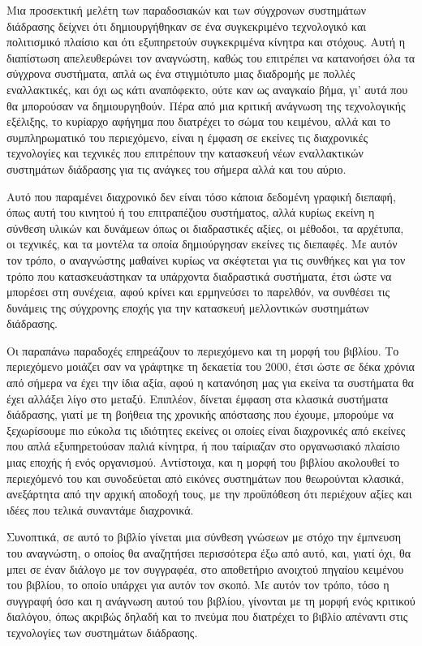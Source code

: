 \documentclass[
]{article}
\begin{document}
Μια προσεκτική μελέτη των παραδοσιακών και των σύγχρονων συστημάτων
διάδρασης δείχνει ότι δημιουργήθηκαν σε ένα συγκεκριμένο τεχνολογικό και
πολιτισμικό πλαίσιο και ότι εξυπηρετούν συγκεκριμένα κίνητρα και
στόχους. Αυτή η διαπίστωση απελευθερώνει τον αναγνώστη, καθώς του
επιτρέπει να κατανοήσει όλα τα σύγχρονα συστήματα, απλά ως ένα
στιγμιότυπο μιας διαδρομής με πολλές εναλλακτικές, και όχι ως κάτι
αναπόφεκτο, ούτε καν ως αναγκαίο βήμα, γι' αυτά που θα μπορούσαν να
δημιουργηθούν. Πέρα από μια κριτική ανάγνωση της τεχνολογικής εξέλιξης,
το κυρίαρχο αφήγημα που διατρέχει το σώμα του κειμένου, αλλά και το
συμπληρωματικό του περιεχόμενο, είναι η έμφαση σε εκείνες τις
διαχρονικές τεχνολογίες και τεχνικές που επιτρέπουν την κατασκευή νέων
εναλλακτικών συστημάτων διάδρασης για τις ανάγκες του σήμερα αλλά και
του αύριο.

Αυτό που παραμένει διαχρονικό δεν είναι τόσο κάποια δεδομένη γραφική
διεπαφή, όπως αυτή του κινητού ή του επιτραπέζιου συστήματος, αλλά
κυρίως εκείνη η σύνθεση υλικών και δυνάμεων όπως οι διαδραστικές αξίες,
οι μέθοδοι, τα αρχέτυπα, οι τεχνικές, και τα μοντέλα τα οποία
δημιούργησαν εκείνες τις διεπαφές. Με αυτόν τον τρόπο, ο αναγνώστης
μαθαίνει κυρίως να σκέφτεται για τις συνθήκες και για τον τρόπο που
κατασκευάστηκαν τα υπάρχοντα διαδραστικά συστήματα, έτσι ώστε να
μπορέσει στη συνέχεια, αφού κρίνει και ερμηνεύσει το παρελθόν, να
συνθέσει τις δυνάμεις της σύγχρονης εποχής για την κατασκευή μελλοντικών
συστημάτων διάδρασης.

Οι παραπάνω παραδοχές επηρεάζουν το περιεχόμενο και τη μορφή του
βιβλίου. Το περιεχόμενο μοιάζει σαν να γράφτηκε τη δεκαετία του 2000,
έτσι ώστε σε δέκα χρόνια από σήμερα να έχει την ίδια αξία, αφού η
κατανόηση μας για εκείνα τα συστήματα θα έχει αλλάξει λίγο στο μεταξύ.
Επιπλέον, δίνεται έμφαση στα κλασικά συστήματα διάδρασης, γιατί με τη
βοήθεια της χρονικής απόστασης που έχουμε, μπορούμε να ξεχωρίσουμε πιο
εύκολα τις ιδιότητες εκείνες οι οποίες είναι διαχρονικές από εκείνες που
απλά εξυπηρετούσαν παλιά κίνητρα, ή που ταίριαζαν στο οργανωσιακό
πλαίσιο μιας εποχής ή ενός οργανισμού. Αντίστοιχα, και η μορφή του
βιβλίου ακολουθεί το περιεχόμενό του και συνοδεύεται από εικόνες
συστημάτων που θεωρούνται κλασικά, ανεξάρτητα από την αρχική αποδοχή
τους, με την προϋπόθεση ότι περιέχουν αξίες και ιδέες που τελικά
συναντάμε διαχρονικά.

Συνοπτικά, σε αυτό το βιβλίο γίνεται μια σύνθεση γνώσεων με στόχο την
έμπνευση του αναγνώστη, ο οποίος θα αναζητήσει περισσότερα έξω από αυτό,
και, γιατί όχι, θα μπει σε έναν διάλογο με τον συγγραφέα, στο αποθετήριο
ανοιχτού πηγαίου κειμένου του βιβλίου, το οποίο υπάρχει για αυτόν τον
σκοπό. Με αυτόν τον τρόπο, τόσο η συγγραφή όσο και η ανάγνωση αυτού του
βιβλίου, γίνονται με τη μορφή ενός κριτικού διαλόγου, όπως ακριβώς
δηλαδή και το πνεύμα που διατρέχει το βιβλίο απέναντι στις τεχνολογίες
των συστημάτων διάδρασης.
\end{document}
